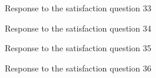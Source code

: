 \documentclass[12pt,oneside,openright,a4paper]{cpe-english-project}
\begin{document}
\begin{figure}[!h]\centering {} \caption{Response to the satisfaction question 33} \end{figure}
\begin{figure}[!h]\centering {} \caption{Response to the satisfaction question 34} \end{figure}
\begin{figure}[!h]\centering {} \caption{Response to the satisfaction question 35} \end{figure}
\begin{figure}[!h]\centering {} \caption{Response to the satisfaction question 36} \end{figure}
\end{document}
